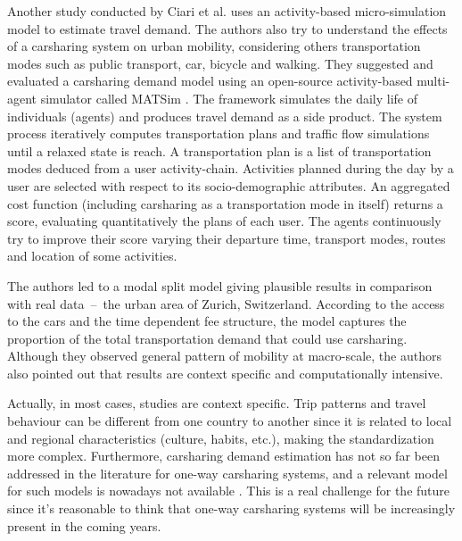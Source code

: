 \begin{bibunit}[ieeetr]
\medskip
Another study conducted by Ciari et al. \cite{ciari_estimation_2013} uses an activity-based micro-simulation model to estimate travel demand.
The authors also try to understand the effects of a carsharing system on urban mobility, considering others transportation modes such as public transport, car, bicycle and walking.
They suggested and evaluated a carsharing demand model using an open-source activity-based multi-agent simulator called MATSim \cite{matsim_webPage}.
The framework simulates the daily life of individuals (agents) and produces travel demand as a side product.
The system process iteratively computes transportation plans and traffic flow simulations until a relaxed state is reach.
A transportation plan is a list of transportation modes deduced from a user activity-chain.
Activities planned during the day by a user are selected with respect to its socio-demographic attributes.
An aggregated cost function (including carsharing as a transportation mode in itself) returns a score, evaluating quantitatively the plans of each user.
The agents continuously try to improve their score varying their departure time, transport modes, routes and location of some activities.

The authors led to a modal split model giving plausible results in comparison with real \mbox{data -- the} urban area of Zurich, Switzerland.
According to the access to the cars and the time dependent fee structure, the model captures the proportion of the total transportation demand that could use carsharing.
Although they observed general pattern of mobility at macro-scale, the authors also pointed out that results are context specific and computationally intensive.


\bigskip
Actually, in most cases, studies are context specific.
Trip patterns and travel behaviour can be different from one country to another since it is related to local and regional characteristics (culture, habits, etc.), making the standardization more complex.
Furthermore, carsharing demand estimation has not so far been addressed in the literature for one-way carsharing systems, and a relevant model for such models is nowadays not available \cite{jorge_carsharing_2013}.
This is a real challenge for the future since it's reasonable to think that one-way carsharing systems will be increasingly present in the coming years.




\end{bibunit}
